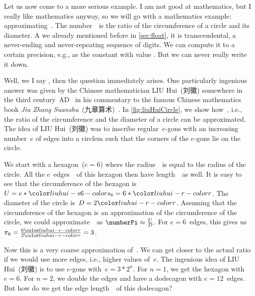 %
\def\liuhuix{\ensuremath{{\color{liuhui-x-color}x}}}%
%
\def\liuhuistf{\ensuremath{{\color{liuhui-s24-color}s_{24}}}}%
%
Let us now come to a more serious example.
I am not good at mathematics, but I really like mathematics anyway, so we will go with a mathematics example: approximating~\numberPi.
The number~\numberPi\ is the ratio of the circumference of a circle and its diameter.
A we already mentioned before in \cref{sec:float}, it is transcendental, a never-ending and never-repeating sequence of digits.
We can compute it to a certain precision, e.g., as the  constant  with value .
But we can never really write it down.

Well, we I say , then the question  immediately arises.
One particularly ingenious answer was given by the Chinese mathematician LIU Hui~(刘徽) somewhere in the third century~AD~\cite{OR2003LH} in his commentary to the famous Chinese mathematics book \emph{Jiu Zhang Suanshu}~(九章算术)~\cite{OR2003LH,SCL1999TNCOTMACAC,S1998LHATFGAOCM,D2010AALHOCAS,C2002LFLHADWTDM}.
In \cref{fig:liuHuiCircle}, we show how~\numberPi, i.e., the ratio of the circumference and the diameter of a circle can be approximated.
The idea of LIU Hui~(刘徽) was to inscribe regular~$e$\nobreakdashes-gons with an increasing number~$e$ of edges into a circlem such that the corners of the $e$\nobreakdashes-gons lie on the circle.

We start with a hexagon~($e=6$) where the radius~\liuhuir\ is equal to the radius of the circle.
All the $e$~edges~\liuhuiss\ of this hexagon then have length~\liuhuir\ as well.
It is easy to see that the circumference of the hexagon is~$U=e*\liuhuiss=6*\liuhuir$.
The diameter of the circle is~$D=2\liuhuir$.
Assuming that the circumference of the hexagon is an approximation of the circumference of the circle, we could approximate~\numberPi\ as $\numberPi\approx\frac{U}{D}$.
For $e=6$~edges, this gives us $\pi_6=\frac{6\liuhuir}{2\liuhuir}=3$.

Now this is a very coarse approximation of~\numberPi.
We can get closer to the actual ratio if we would use more edges, i.e., higher values of~$e$.
The ingenious idea of LIU Hui~(刘徽) is to use $e$\nobreakdashes-gons with~$e=3*2^n$.
For $n=1$, we get the hexagon with $e=6$.
For $n=2$, we double the edges and have a dodecagon with $e=12$~edges.
But how do we get the edge length~\liuhuist\ of this dodecagon?

